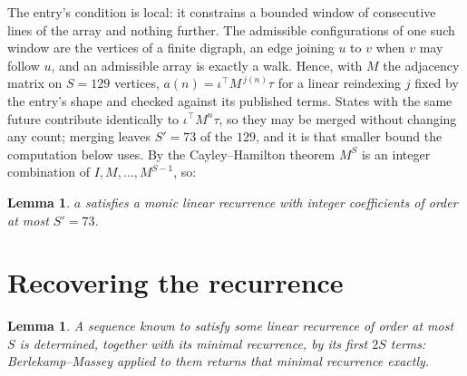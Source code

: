 \documentclass[11pt,a4paper]{article}
\theoremstyle{plain}
\newtheorem{lemma}[theorem]{Lemma}
\theoremstyle{definition}
\begin{document}
The entry's condition is local: it constrains a bounded window of consecutive lines of the
array and nothing further. The admissible configurations of one such window are the vertices
of a finite digraph, an edge joining $u$ to $v$ when $v$ may follow $u$, and an admissible
array is exactly a walk. Hence, with $M$ the adjacency matrix on $S=129$ vertices,
$a(n)=\iota^{\!\top}M^{\,j(n)}\tau$ for a linear reindexing $j$ fixed by the entry's shape
and checked against its published terms. States with the same future contribute identically to $\iota^{\!\top}M^n\tau$, so they may be merged without changing any count; merging leaves $S'=73$ of the $129$, and it is that smaller bound the computation below uses. By the Cayley--Hamilton theorem $M^{S}$ is an
integer combination of $I,M,\dots,M^{S-1}$, so:

\begin{lemma}\label{lem:cf}
$a$ satisfies a monic linear recurrence with integer coefficients of order at most
$S'=73$.
\end{lemma}

\section{Recovering the recurrence}

\begin{lemma}\label{lem:bm}
A sequence known to satisfy some linear recurrence of order at most $S$ is determined, together
with its minimal recurrence, by its first $2S$ terms: Berlekamp--Massey applied to them returns
that minimal recurrence exactly.
\end{lemma}
\end{document}
